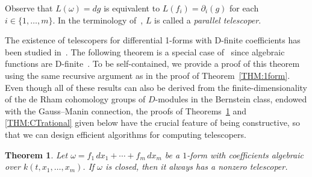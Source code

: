 \documentclass{amsart}
\newtheorem{thm}{Theorem}
\theoremstyle{definition}
\numberwithin{equation}{section}
\numberwithin{thm}{section}
\begin{document}
Observe that $L(\omega) = dg$ is equivalent to $L(f_i) = \partial_i(g)$ for each $i \in \{1,\dots,m\}$.  In the terminology of~\cite{ChenFengLiSinger2014}, %
$L$ is called a \textit{parallel telescoper}.

The existence of telescopers for differential 1-forms with D-finite coefficients has been studied in~\cite{ChenFengLiSinger2014, ChenFengLiSingerWatt2024}. The following theorem is a special case of~\cite[Lemma~8]{ChenFengLiSinger2014} since algebraic functions are D-finite~\cite{Abel1827}. To be self-contained, we provide a proof of this theorem using the same recursive argument as in the proof of Theorem~\ref{THM:1form}.
Even though all of these results can also be derived from the finite-dimensionality of the de Rham cohomology groups of $D$-modules in the Bernstein class, endowed with the Gauss--Manin connection, the proofs of Theorems~\ref{THM:existCT1form} and \ref{THM:CTrational} given below have the crucial feature of being constructive, so that we can design efficient algorithms for computing telescopers. 

\begin{thm}\label{THM:existCT1form}
	Let $\omega= f_1 \, dx_1+ \cdots + f_m \, dx_m$ be a $1$-form with coefficients algebraic over $k(t,x_1,\ldots,x_m)$. If $\omega$ is closed, then it always has a nonzero telescoper.
\end{thm}
\end{document}
